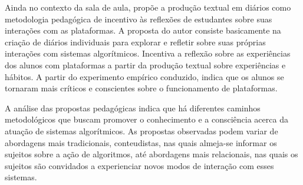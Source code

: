 Ainda no contexto da sala de aula, \textcite{Koenig2020} propõe a produção
textual em diários como metodologia pedagógica de incentivo às reflexões
de estudantes sobre suas interações com as plataformas. A proposta do
autor consiste basicamente na criação de diários individuais para
explorar e refletir sobre suas próprias interações com sistemas
algorítmicos. Incentiva a reflexão sobre as experiências dos alunos com
plataformas a partir da produção textual sobre experiências e hábitos. A
partir do experimento empírico conduzido, \textcite{Koenig2020} indica que os
alunos se tornaram mais críticos e conscientes sobre o funcionamento de
plataformas.

A análise das propostas pedagógicas indica que há diferentes caminhos
metodológicos que buscam promover o conhecimento e a consciência acerca
da atuação de sistemas algorítmicos. As propostas observadas podem
variar de abordagens mais tradicionais, conteudistas, nas quais
almeja-se informar os sujeitos sobre a ação de algoritmos, até
abordagens mais relacionais, nas quais os sujeitos são convidados a
experienciar novos modos de interação com esses sistemas.